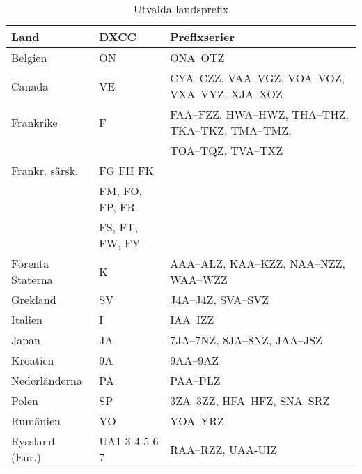 \begin{center}
	\begin{footnotesize}
		\begin{longtable}{lll}
			\caption{Utvalda landsprefix} \\
			\textbf{Land}                 & \textbf{DXCC}  & \textbf{Prefixserier}                             \\ \hline
			Belgien                       & ON             & ONA--OTZ                                          \\
			Canada                        & VE             & CYA--CZZ, VAA--VGZ, VOA--VOZ, VXA--VYZ, XJA--XOZ  \\
			Frankrike                     & F              & FAA--FZZ, HWA--HWZ, THA--THZ, TKA--TKZ, TMA--TMZ, \\
			                              &                & TOA--TQZ, TVA--TXZ                                \\
			Frankr. särsk.                & FG FH FK       &                                                   \\
			                              & FM, FO, FP, FR &                                                   \\
			                              & FS, FT, FW, FY &                                                   \\
			Förenta Staterna              & K              & AAA--ALZ, KAA--KZZ, NAA--NZZ, WAA--WZZ            \\
			Grekland                      & SV             & J4A--J4Z, SVA--SVZ                                \\
			Italien                       & I              & IAA--IZZ                                          \\
			Japan                         & JA             & 7JA--7NZ, 8JA--8NZ, JAA--JSZ                      \\
			Kroatien                      & 9A             & 9AA--9AZ                                          \\
			Nederländerna                 & PA             & PAA--PLZ                                          \\
			Polen                         & SP             & 3ZA--3ZZ, HFA--HFZ, SNA--SRZ                      \\
			Rumänien                      & YO             & YOA--YRZ                                          \\
			Ryssland (Eur.)               & UA1 3 4 5 6 7  & RAA--RZZ, UAA-UIZ                                 \\

\end{longtable}
\end{footnotesize}
\end{center}
